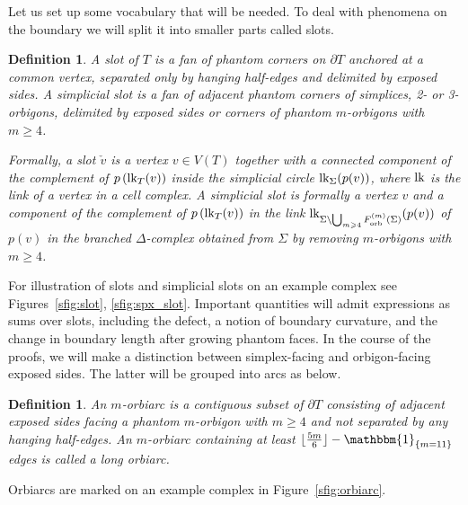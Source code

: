 \documentclass{amsart}
\newtheorem{definition}[conjecture]{Definition}
\newcommand{\Forb}[1][m]{F^{(#1)}_{\textnormal{orb}}}
\newcommand{\tn}{\textnormal}
\begin{document}
Let us set up some vocabulary that will be needed. To deal with phenomena on the boundary we will split it into smaller parts called slots.
\begin{definition}\label{def:site}
A \emph{slot} of $T$ is a fan of phantom corners on $\partial T$ anchored at a common vertex, separated only by hanging half-edges and delimited by exposed sides. A \emph{simplicial slot} is a fan of adjacent phantom corners of simplices, 2- or 3-orbigons, delimited by exposed sides or corners of phantom $m$-orbigons with $m\geqslant4$.

Formally, a slot $\check{v}$ is a vertex $v\in V(T)$ together with a connected component of the complement of $p\left(\tn{lk}_T(v)\right)$ inside the simplicial circle $\tn{lk}_\Sigma(p(v))$, where $\tn{lk}$ is the link of a vertex in a cell complex. A simplicial slot is formally a vertex $v$ and a component of the complement of $p\left(\tn{lk}_T(v)\right)$ in the link $\tn{lk}_{\Sigma\setminus\bigcup_{m\geqslant4}\Forb(\Sigma)}(p(v))$ of $p(v)$ in the branched $\Delta$-complex obtained from $\Sigma$ by removing $m$-orbigons with $m\geqslant4$.
\end{definition}
For illustration of slots and simplicial slots on an example complex see Figures~\ref{sfig:slot}, \ref{sfig:spx_slot}. Important quantities will admit expressions as sums over slots, including the defect, a notion of boundary curvature, and the change in boundary length after growing phantom faces. In the course of the proofs, we will make a distinction between simplex-facing and orbigon-facing exposed sides. The latter will be grouped into arcs as below.
\begin{definition}\label{def:orbiarc}
An \emph{$m$-orbiarc} is a contiguous subset of $\partial T$ consisting of adjacent exposed sides facing a phantom $m$-orbigon with $m\geqslant4$ and not separated by any hanging half-edges. An $m$-orbiarc containing at least $\lfloor\tfrac{5m}{6}\rfloor-\mathbbm{1}_{\{m=11\}}$ edges is called a \emph{long orbiarc}.
\end{definition}
Orbiarcs are marked on an example complex in Figure~\ref{sfig:orbiarc}.
\end{document}
